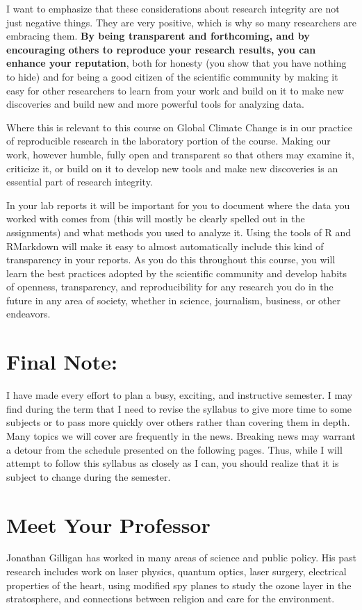 \documentclass[11pt,twoside]{jgsyllabus}\usepackage[]{graphicx}\usepackage[]{xcolor}
\begin{document}
I want to emphasize that these considerations about research integrity are not
just negative things. They are very positive, which is why so many researchers
are embracing them.
\textbf{By being transparent and forthcoming, and by encouraging
others to reproduce your research results, you can enhance your reputation},
both for honesty (you show that you have nothing to hide) and for being a
good citizen of the scientific community by making it easy for other researchers
to learn from your work and build on it to make new discoveries and build
new and more powerful tools for analyzing data.

Where this is relevant to this course on Global Climate Change is in our
practice of reproducible research in the laboratory portion of the course.
Making our work, however humble, fully open and transparent so that others
may examine it, criticize it, or build on it to develop new tools and make
new discoveries is an essential part of research integrity.

In your lab reports it will be important for you to document where the data you
worked with comes from (this will mostly be clearly spelled out in the
assignments) and what methods you used to analyze it. Using the tools of R and
RMarkdown will make it easy to almost automatically include this kind of
transparency in your reports. As you do this throughout this course, you will
learn the best practices adopted by the scientific community and develop habits
of openness, transparency, and reproducibility for any research you do in the
future in any area of society, whether in science, journalism, business, or
other endeavors.
\fi

\section{Final Note:}
I have made every effort to plan a busy, exciting, and instructive semester.
I may find during the term that I need to revise the syllabus to give more time
to some subjects or to pass more quickly over others rather than covering them
in depth. Many topics we will cover are frequently in the news. Breaking news
may warrant a detour from the schedule presented on the following pages.
Thus, while I will attempt to follow this syllabus as closely as I can,
you should realize that it is subject to change during the semester.

\clearpage
\section{Meet Your Professor}
Jonathan Gilligan has worked in many areas of science and public policy.
His past research includes work on laser physics, quantum optics,
laser surgery, electrical properties of the heart, using modified spy planes to
study the ozone layer in the stratosphere, and connections between religion and
care for the environment.
\iffalse
\end{document}
